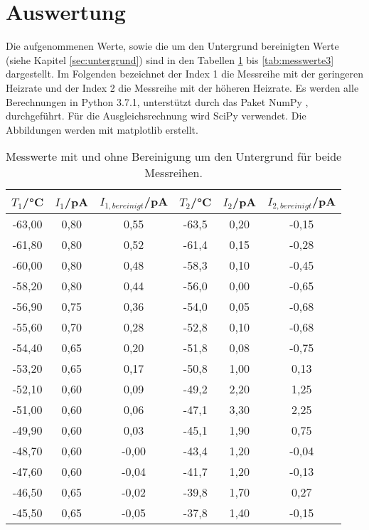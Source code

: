 \section{Auswertung}
\label{sec:Auswertung}

Die aufgenommenen Werte, sowie die um den Untergrund bereinigten Werte (siehe
Kapitel \ref{sec:untergrund}) sind in den Tabellen \ref{tab:messwerte1}
bis \ref{tab:messwerte3} dargestellt. Im Folgenden bezeichnet der Index 1 die
Messreihe mit der geringeren Heizrate und der Index 2 die Messreihe mit der
höheren Heizrate. Es werden alle Berechnungen in Python 3.7.1, unterstützt durch das
Paket NumPy \cite{numpy}, durchgeführt. Für die Ausgleichsrechnung wird SciPy
\cite{scipy} verwendet. Die Abbildungen werden mit matplotlib \cite{matplotlib} erstellt.

\begin{table}[htp]
	\begin{center}
    \caption{Messwerte mit und ohne Bereinigung um den Untergrund für beide Messreihen.}
    \label{tab:messwerte1}
		\begin{tabular}{cccccc}
		\toprule
			{$T_1$/°C} & {$I_1$/pA} & {$I_{1,bereinigt}$/pA} & {$T_2$/°C} & {$I_2$/pA} & {$I_{2,bereinigt}$/pA}\\
			\midrule
			-63,00 & 0,80 & 0,55 & -63,5 & 0,20 & -0,15\\
			-61,80 & 0,80 & 0,52 & -61,4 & 0,15 & -0,28\\
			-60,00 & 0,80 & 0,48 & -58,3 & 0,10 & -0,45\\
			-58,20 & 0,80 & 0,44 & -56,0 & 0,00 & -0,65\\
			-56,90 & 0,75 & 0,36 & -54,0 & 0,05 & -0,68\\
			-55,60 & 0,70 & 0,28 & -52,8 & 0,10 & -0,68\\
			-54,40 & 0,65 & 0,20 & -51,8 & 0,08 & -0,75\\
			-53,20 & 0,65 & 0,17 & -50,8 & 1,00 & 0,13\\
			-52,10 & 0,60 & 0,09 & -49,2 & 2,20 & 1,25\\
			-51,00 & 0,60 & 0,06 & -47,1 & 3,30 & 2,25\\
			-49,90 & 0,60 & 0,03 & -45,1 & 1,90 & 0,75\\
			-48,70 & 0,60 & -0,00 & -43,4 & 1,20 & -0,04\\
			-47,60 & 0,60 & -0,04 & -41,7 & 1,20 & -0,13\\
			-46,50 & 0,65 & -0,02 & -39,8 & 1,70 & 0,27\\
			-45,50 & 0,65 & -0,05 & -37,8 & 1,40 & -0,15\\

\end{tabular}
\end{center}
\end{table}
